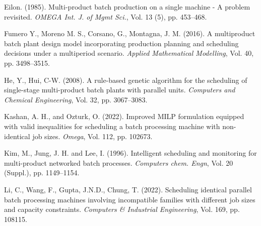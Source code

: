 \documentclass[authoryear,manuscript,12pt]{elsarticle}
\begin{document}




\begin{thebibliography}{1}


Eilon. (1985). Multi-product batch production on a single machine - A problem revisited. {\it OMEGA Int. J. of Mgmt Sci.}, Vol. 13 (5), pp. 453--468.

Fumero Y., Moreno M. S., Corsano, G., Montagna, J. M. (2016). A multiproduct batch plant design model incorporating production planning and scheduling decisions under a multiperiod scenario. {\it Applied Mathematical Modelling}, Vol. 40, pp. 3498--3515.

He, Y., Hui, C-W. (2008). A rule-based genetic algorithm for the scheduling of single-stage multi-product batch plants with parallel units. {\it  Computers and Chemical Engineering}, Vol. 32, pp. 3067--3083.

Kashan, A. H., and Ozturk, O. (2022). Improved MILP formulation equipped with valid inequalities for scheduling a batch processing machine with non-identical job sizes. {\it  Omega}, Vol. 112, pp. 102673.

Kim, M., Jung, J. H. and Lee, I. (1996). Intelligent scheduling and monitoring for multi-product networked batch processes. {\it  Computers chem. Engn}, Vol. 20 (Suppl.), pp. 1149--1154.

Li, C., Wang, F., Gupta, J.N.D., Chung, T. (2022). Scheduling identical parallel batch processing machines involving incompatible families with different job sizes and capacity constraints. {\it Computers \& Industrial Engineering}, Vol. 169, pp. 108115.


\end{thebibliography}
\end{document}
